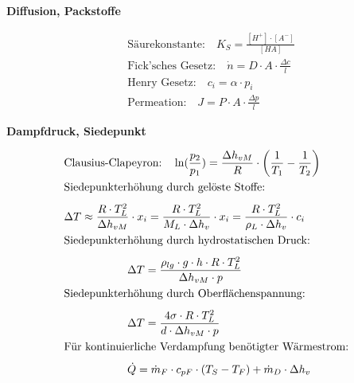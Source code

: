 \begin{minipage}[t]{.35\textwidth}
\vspace*{5.5mm}
\textbf{Diffusion, Packstoffe} \par \vspace*{-4mm}
\begin{align*}
&\text{Säurekonstante:} \quad K_S = \frac{[H^+] \cdot [A^-]}{[HA]} \\ 
&\text{Fick'sches Gesetz:} \quad \dot{n} = D \cdot A \cdot \frac{\Delta c}{l} \\[5pt]
&\text{Henry Gesetz:} \quad c_i = \alpha \cdot p_i \\[3pt]
&\text{Permeation:} \quad J = P \cdot A \cdot \frac{\Delta p}{l}   
\end{align*}
\vspace*{2mm}



\textbf{Dampfdruck, Siedepunkt} \par \vspace*{-4mm}
\begin{align*}
&\text{Clausius-Clapeyron:} \quad \ln(\frac{p_2}{p_1}) = \frac{\Delta h_{vM}}{R} \cdot \left(\frac{1}{T_1} - \frac{1}{T_2} \right) \\
&\text{Siedepunkterhöhung durch gelöste Stoffe:}\\[4pt]
& \Delta T \approx \frac{R \cdot T_L^2}{\Delta h_{vM}} \cdot x_i = \frac{R \cdot T_L^2}{M_L \cdot \Delta h_v} \cdot x_i =\frac{R \cdot T_L^2}{\rho_L \cdot \Delta h_v} \cdot c_i \\
&\text{Siedepunkterhöhung durch hydrostatischen Druck:}\\[4pt]
&\hspace*{2cm} \Delta T = \frac{\rho_{lg} \cdot g \cdot h \cdot R \cdot T_L^2}{\Delta h_{vM} \cdot p}\\
&\text{Siedepunkterhöhung durch Oberflächenspannung:}\\[4pt]
&\hspace*{2cm} \Delta T = \frac{4 \sigma \cdot R \cdot T_L^2}{d \cdot \Delta h_{vM} \cdot p} \\
&\text{Für kontinuierliche Verdampfung benötigter Wärmestrom:}\\[4pt]
&\hspace*{2cm} \dot{Q} = \dot{m}_F \cdot c_{pF} \cdot (T_S - T_F) + \dot{m}_D \cdot \Delta h_v
\end{align*}



\end{minipage}
